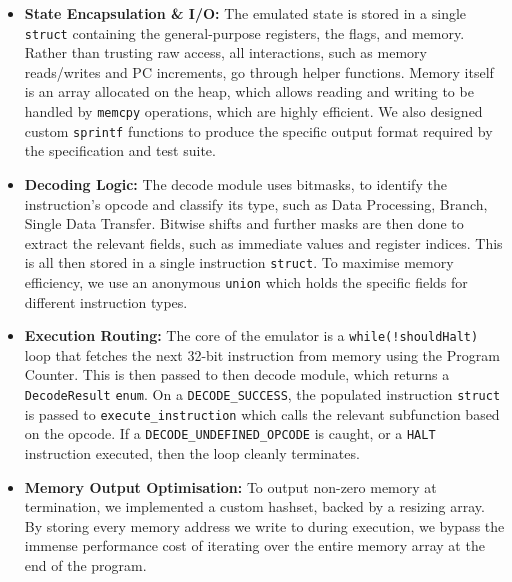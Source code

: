 \documentclass[11pt]{article}
\begin{document}
\begin{itemize}
    \item \textbf{State Encapsulation \& I/O:} The emulated state is stored in a single \texttt{struct} containing the general-purpose registers, the flags, and memory. Rather than trusting raw access, all interactions, such as memory reads/writes and PC increments, go through helper functions. Memory itself is an array allocated on the heap, which allows reading and writing to be handled by \texttt{memcpy} operations, which are highly efficient. We also designed custom \texttt{sprintf} functions to produce the specific output format required by the specification and test suite.
    \vspace{-0.1cm}
    \item \textbf{Decoding Logic:} The decode module uses bitmasks, to identify the instruction's opcode and classify its type, such as Data Processing, Branch, Single Data Transfer. Bitwise shifts and further  masks are then done to extract the relevant fields, such as immediate values and register indices. This is all then stored in a single instruction \texttt{struct}. To maximise memory efficiency, we use an anonymous \texttt{union} which holds the specific fields for different instruction types.
    \vspace{-0.1cm}
    \item \textbf{Execution Routing:} The core of the emulator is a \texttt{while(!shouldHalt)} loop that fetches the next 32-bit instruction from memory using the Program Counter. This is then passed to then decode module, which returns a \texttt{DecodeResult} \texttt{enum}. On a \texttt{DECODE\_SUCCESS}, the populated instruction \texttt{struct} is passed to \texttt{execute\_instruction} which calls the relevant subfunction based on the opcode. If a \texttt{DECODE\_UNDEFINED\_OPCODE} is caught, or a \texttt{HALT} instruction executed, then the loop cleanly terminates.
    \vspace{-0.1cm}
    \item \textbf{Memory Output Optimisation:} To output non-zero memory at termination, we implemented a custom hashset, backed by a resizing array. By storing every memory address we write to during execution, we bypass the immense performance cost of iterating over the entire memory array at the end of the program.
\end{itemize}
\vspace{-0.2cm}
\end{document}
